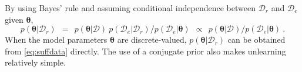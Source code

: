 \documentclass{article}
\theoremstyle{definition}
\newtheorem{proposition}{Proposition}
\newcommand{\mcl}[1]{\mathcal{#1}}
\newcommand{\da}{\mcl{D}}
\newcommand{\dc}{\mcl{D}_r}
\newcommand{\dr}{\mcl{D}_e}
\begin{document}
%
%
%
%
By using Bayes' rule and assuming conditional independence between $\dc$ and $\dr$ given $\bm{\theta}$, 
%
\begin{equation}
p(\bm{\theta}|\dc)\ \ =\ \  {p(\bm{\theta}|\da) \ p(\dr|\dc)}/{p(\dr| \bm{\theta})}
	\ \ \propto\ \  {p(\bm{\theta}|\da)}/{p(\dr| \bm{\theta})}\ .
\label{eq:suffdata}
\end{equation}
%
%
%
When the model parameters $\bm{\theta}$ are discrete-valued, $p(\bm{\theta}|\dc)$ can be  obtained from \eqref{eq:suffdata} directly. 
The use of a conjugate prior also makes unlearning relatively simple.
\end{document}
